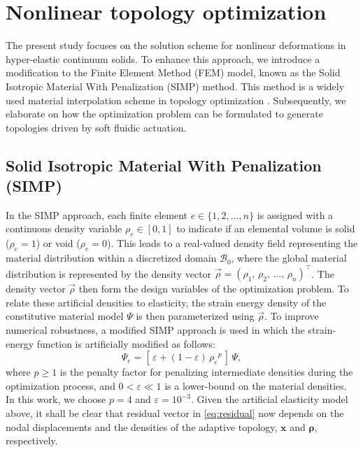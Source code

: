 \section{Nonlinear topology optimization}
\label{sec:C1:topo} 
The present study focuses on the solution scheme for nonlinear deformations in hyper-elastic continuum solids. To enhance this approach, we introduce a modification to the Finite Element Method (FEM) model, known as the Solid Isotropic Material With Penalization (SIMP) method. This method is a widely used material interpolation scheme in topology optimization \cite{Bendsoe2003,Gain2013Dec,Talischi2012Mar,Vasista2013Jul}. Subsequently, we elaborate on how the optimization problem can be formulated to generate topologies driven by soft fluidic actuation.

\subsection{Solid Isotropic Material With Penalization (SIMP)}
In the SIMP approach, each finite element $e \in \{1,2,...,n\}$ is assigned with a continuous density variable $\rho_e \in [0,1]$ to indicate if an elemental volume is solid ($\rho_e = 1$) or void ($\rho_e = 0$). This leads to a real-valued density field representing the material distribution within a discretized domain $\mathcal{B}_0$, where the global material distribution is represented by the density vector $\vec{\rho} = \left(\rho_1,\,\rho_2,\,...,\,\rho_n\right)^\top$. The density vector $\vec{\rho}$ then form the design variables of the optimization problem. To relate these artificial densities to elasticity, the strain energy density of the constitutive material model ${\Psi}$ is then parameterized using $\vec{\rho}$. To improve numerical robustness, a modified SIMP approach is used in which the strain-energy function is artificially modified as follows:
%
\begin{equation}
{\Psi}_e = [\,\varepsilon + (1-\varepsilon)\,{\rho_e}^p\,]\, {\Psi}, \label{eq:simp}
\end{equation}
%
where $p\ge 1$ is the penalty factor for penalizing intermediate densities during the optimization process, and $0 < \varepsilon \ll 1$ is a lower-bound on the material densities. In this work, we choose $p = 4$ and $\varepsilon = 10^{-3}$. Given the artificial elasticity model above, it shall be clear that residual vector in \eqref{eq:residual} now depends on the nodal displacements and the densities of the adaptive topology, $\boldsymbol{x}$ and $\boldsymbol{\rho}$, respectively.

